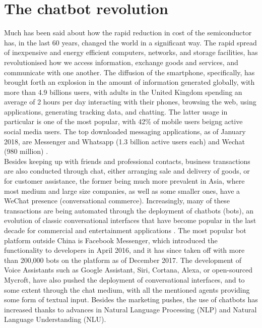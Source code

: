 \section{The chatbot revolution}
Much has been said about how the rapid reduction in cost of the semiconductor has, in the last 60 years, changed the world in a significant way. The rapid spread of inexpensive and energy efficient computers, networks, and storage facilities, has revolutionised how we access information, exchange goods and services, and communicate with one another. The diffusion of the smartphone, specifically, has brought forth an explosion in the amount of information generated globally, with more than 4.9 billions users, with adults in the United Kingdom spending an average of 2 hours per day interacting with their phones, browsing the web, using applications, generating tracking data, and chatting. The latter usage in particular is one of the most popular, with 42\% of mobile users \cite{mobilesocial} beigng active social media users. The top downloaded messaging applications, as of January 2018, are Messenger and Whatsapp (1.3 billion active users each) and Wechat (980 million) \cite{mobilestatista}. \\
Besides keeping up with friends and professional contacts, business transactions are also conducted through chat, either arranging sale and delivery of goods, or for customer assistance, the former being much more prevalent in Asia, where most medium and large size companies, as well as some smaller ones, have a WeChat presence (conversational commerce). Increasingly, many of these transactions are being automated through the deployment of chatbots (bots), an evolution of classic conversational interfaces that have become popular in the last decade for commercial and entertainment applications \cite{Dale2016}. The most popular bot platform outside China is Facebook Messenger, which introduced the functionality to developers in April 2016\cite{Messenger2016}, and it has since taken off with more than 200,000 bots on the platform as of December 2017\cite{Messenger2017}. The development of Voice Assistants such as Google Assistant, Siri, Cortana, Alexa, or open-sourced Mycroft, have also pushed the deployment of conversational interfaces, and to some extent through the chat medium, with all the mentioned agents providing some form of textual input.
Besides the marketing pushes, the use of chatbots has increased thanks to advances in Natural Language Processing (NLP) and Natural Language Understanding (NLU). \\
